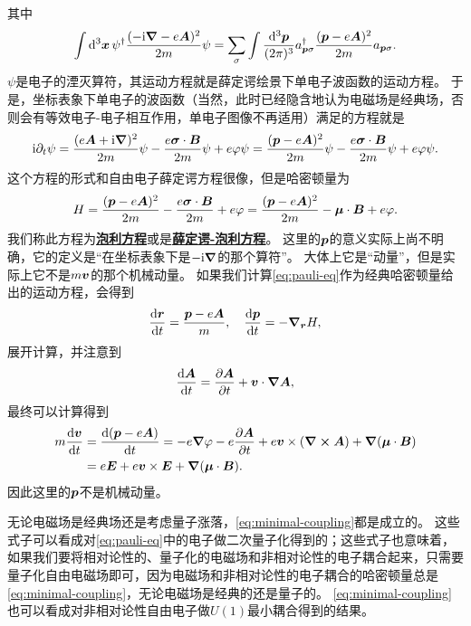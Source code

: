 \documentclass[hyperref, UTF8, a4paper]{ctexart}
\newcommand*{\ii}{\mathrm{i}}
\newcommand{\concept}[1]{\underline{\textbf{#1}}}
\begin{document}
其中
\begin{equation}
    \int \dd[3]{\vb*{x}} \psi^\dagger \frac{(- \ii \grad - e \vb*{A})^2}{2m} \psi = \sum_\sigma \int \frac{\dd[3]{\vb*{p}}}{(2\pi)^3} a^\dagger_{\vb*{p} \sigma} \frac{(\vb*{p} - e \vb*{A})^2}{2m} a_{\vb*{p} \sigma}.
\end{equation}
$\psi$是电子的湮灭算符，其运动方程就是薛定谔绘景下单电子波函数的运动方程。
于是，坐标表象下单电子的波函数（当然，此时已经隐含地认为电磁场是经典场，否则会有等效电子-电子相互作用，单电子图像不再适用）满足的方程就是
\begin{equation}
    \ii \partial_t \psi = \frac{(e \vb*{A} + \ii \grad)^2}{2m} \psi - \frac{e \vb*{\sigma} \cdot \vb*{B}}{2m} \psi + e \varphi \psi = \frac{(\vb*{p} - e \vb*{A})^2}{2m} \psi - \frac{e \vb*{\sigma} \cdot \vb*{B}}{2m} \psi + e \varphi \psi.
\end{equation}
这个方程的形式和自由电子薛定谔方程很像，但是哈密顿量为
\begin{equation}
    H = \frac{(\vb*{p} - e \vb*{A})^2}{2m} - \frac{e \vb*{\sigma} \cdot \vb*{B}}{2m} + e \varphi = \frac{(\vb*{p} - e \vb*{A})^2}{2m} - \vb*{\mu} \cdot \vb*{B} + e \varphi.
    \label{eq:pauli-eq}
\end{equation}
我们称此方程为\concept{泡利方程}或是\concept{薛定谔-泡利方程}。
这里的$\vb*{p}$的意义实际上尚不明确，它的定义是“在坐标表象下是$-\ii \grad$的那个算符”。
大体上它是“动量”，但是实际上它不是$m \vb*{v}$的那个机械动量。
如果我们计算\eqref{eq:pauli-eq}作为经典哈密顿量给出的运动方程，会得到
\begin{equation}
    \dv{\vb*{r}}{t} = \frac{\vb*{p} - e \vb*{A}}{m}, \quad \dv{\vb*{p}}{t} = - \grad_{\vb*{r}}{H},
\end{equation}
展开计算，并注意到
\[
    \dv{\vb*{A}}{t} = \pdv{\vb*{A}}{t} + \vb*{v} \cdot \grad{\vb*{A}},
\]
最终可以计算得到
\begin{equation}
    \begin{aligned}
        m \dv{\vb*{v}}{t} &= \dv{(\vb*{p} - e \vb*{A})}{t} = - e \grad{\varphi} - e \pdv{\vb*{A}}{t} + e \vb*{v} \times (\curl{\vb*{A}}) + \grad(\vb*{\mu} \cdot \vb*{B}) \\
        &= e \vb*{E} + e \vb*{v} \times \vb*{E} + \grad(\vb*{\mu} \cdot \vb*{B}).
    \end{aligned}
    \label{eq:non-rel-electron-motion}
\end{equation}
因此这里的$\vb*{p}$不是机械动量。

无论电磁场是经典场还是考虑量子涨落，\eqref{eq:minimal-coupling}都是成立的。
这些式子可以看成对\eqref{eq:pauli-eq}中的电子做二次量子化得到的；这些式子也意味着，如果我们要将相对论性的、量子化的电磁场和非相对论性的电子耦合起来，只需要量子化自由电磁场即可，因为电磁场和非相对论性的电子耦合的哈密顿量总是\eqref{eq:minimal-coupling}，无论电磁场是经典的还是量子的。
\eqref{eq:minimal-coupling}也可以看成对非相对论性自由电子做$U(1)$最小耦合得到的结果。
\end{document}
